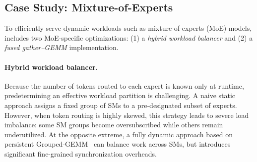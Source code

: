 \subsection{Case Study: Mixture-of-Experts}
\label{subsec:case_study_moe}
To efficiently serve dynamic workloads such as mixture-of-experts (MoE) models, \sys includes two MoE-specific optimizations: (1) a {\em hybrid workload balancer} and (2) a {\em fused gather–GEMM} implementation.


\paragraph{Hybrid workload balancer.}
Because the number of tokens routed to each expert is known only at runtime, predetermining an effective workload partition is challenging. A naive static approach assigns a fixed group of SMs to a pre-designated subset of experts. However, when token routing is highly skewed, this strategy leads to severe load imbalance: some SM groups become oversubscribed while others remain underutilized. At the opposite extreme, a fully dynamic approach based on persistent Grouped-GEMM~\cite{moegroupedgemm} can balance work across SMs, but introduces significant fine-grained synchronization overheads.

